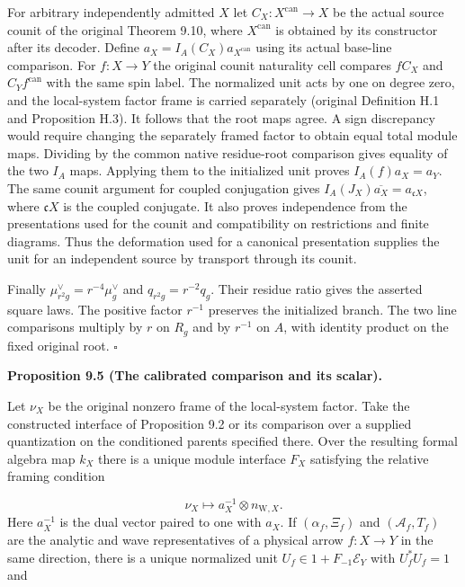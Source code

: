\documentclass[
  english,
  11pt,
  reqno]{amsart}
\makeatletter
\newcommand{\pandocstatementheading}[1]{%
  \par\addpenalty{\@beginparpenalty}%
  \addvspace{.5\baselineskip plus .2\baselineskip minus .2\baselineskip}%
  {\normalfont\bfseries #1\par}%
  \nobreak\@afterindenttrue\@afterheading
}
\makeatother
\begin{document}
For arbitrary independently admitted \(X\) let
\(C_X:X^{\mathrm{can}}\to X\) be the actual source counit of the
original Theorem 9.10, where \(X^{\mathrm{can}}\) is obtained by its
constructor after its decoder. Define
\(a_X=I_A(C_X)a_{X^{\mathrm{can}}}\) using its actual base-line
comparison. For \(f:X\to Y\) the original counit naturality cell
compares \(f C_X\) and \(C_Y f^{\mathrm{can}}\) with the same spin
label. The normalized unit acts by one on degree zero, and the
local-system factor frame is carried separately (original Definition H.1
and Proposition H.3). It follows that the root maps agree. A sign
discrepancy would require changing the separately framed factor to
obtain equal total module maps. Dividing by the common native
residue-root comparison gives equality of the two \(I_A\) maps. Applying
them to the initialized unit proves \(I_A(f)a_X=a_Y\). The same counit
argument for coupled conjugation gives
\(I_A(J_X)\overline{a_X}=a_{\mathfrak c X}\), where \(\mathfrak c X\) is
the coupled conjugate. It also proves independence from the
presentations used for the counit and compatibility on restrictions and
finite diagrams. Thus the deformation used for a canonical presentation
supplies the unit for an independent source by transport through its
counit.

Finally \(\mu_{r^2g}^\vee=r^{-4}\mu_g^\vee\) and \(q_{r^2g}=r^{-2}q_g\).
Their residue ratio gives the asserted square laws. The positive factor
\(r^{-1}\) preserves the initialized branch. The two line comparisons
multiply by \(r\) on \(R_g\) and by \(r^{-1}\) on \(A\), with identity
product on the fixed original root. \hfill\(\square\)

\pandocstatementheading{\leavevmode{}\label{prop:analytic-scalar-one}Proposition 9.5 (The calibrated comparison and its scalar).}

Let \(\nu_X\) be the original nonzero frame of the local-system factor.
Take the constructed interface of Proposition 9.2 or its comparison over
a supplied quantization on the conditioned parents specified there. Over
the resulting formal algebra map \(k_X\) there is a unique module
interface \(F_X\) satisfying the relative framing condition

\label{eq:analytic-factor-calibration} \[
\nu_X\longmapsto a_X^{-1}\otimes n_{\mathrm W,X}.
\] Here \(a_X^{-1}\) is the dual vector paired to one with \(a_X\). If
\((\alpha_f,\Xi_f)\) and \((\mathcal A_f,T_f)\) are the analytic and
wave representatives of a physical arrow \(f:X\to Y\) in the same
direction, there is a unique normalized unit
\(U_f\in1+F_{-1}\mathscr E_Y\) with \(U_f^*U_f=1\) and
\end{document}

